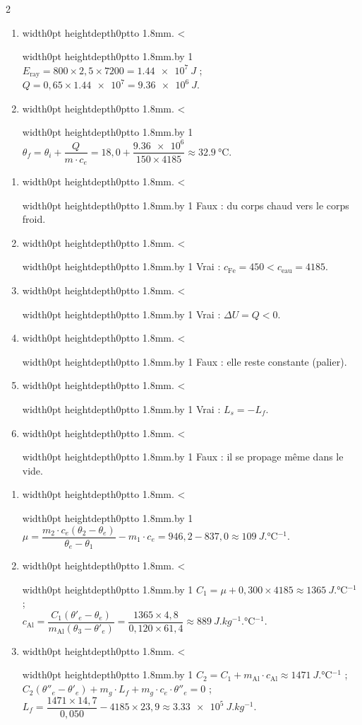 \documentclass[11pt,a4paper]{article}
\newif\ifeleve
\newlength{\interligne}\setlength{\interligne}{7mm}
\newlength{\replen}
\newcommand{\pointilles}{{\color{cInk2!60}\leaders\hbox to 1.8mm{\hss.\hss}\hfill}\kern0pt}
\newcommand{\lignes}[1]{\leavevmode\vrule width0pt height\dimexpr\interligne-1mm\relax depth0pt\pointilles
  \lgn=1 \loop\ifnum\lgn<#1 \par\nointerlineskip\noindent\vrule width0pt height\interligne depth0pt\pointilles\advance\lgn by 1 \repeat}
\newcommand{\rep}[1]{%
  \ifeleve
    \sbox{\repbox}{\parbox{\linewidth}{#1}}%
    \replen=\dimexpr\ht\repbox+\dp\repbox\relax
    \repn=\numexpr\replen/\baselineskip+1\relax
    \ifnum\repn<2 \repn=2\fi
    \edef\nblignes{\the\repn}\lignes{\nblignes}%
  \else #1\fi}
\newcommand{\dC}[1]{\qty{#1}{\degreeCelsius}}
\begin{document}
\begin{multicols}{2}
\begin{enumerate}[label={\sffamily\bfseries\arabic*.},leftmargin=5mm,itemsep=1pt]
  \item \rep{$E_{\mathrm{ray}} = 800\times2{,}5\times7200 = \qty{1,44e7}{J}$ ;\\ $Q = 0{,}65\times\num{1,44e7} = \qty{9,36e6}{J}$.}
  \item \rep{$\theta_f = \theta_i + \dfrac{Q}{m\cdot c_e} = 18{,}0 + \dfrac{\num{9,36e6}}{150\times4185} \approx \dC{32,9}$.}
\end{enumerate}

\begin{enumerate}[label={\sffamily\bfseries\alph*)},leftmargin=5mm,itemsep=0pt]
  \item \rep{Faux : du corps chaud vers le corps froid.}
  \item \rep{Vrai : $c_{\mathrm{Fe}} = 450 < c_{\mathrm{eau}} = 4185$.}
  \item \rep{Vrai : $\Delta U = Q < 0$.}
  \item \rep{Faux : elle reste constante (palier).}
  \item \rep{Vrai : $L_s = -L_f$.}
  \item \rep{Faux : il se propage même dans le vide.}
\end{enumerate}

\begin{enumerate}[label={\sffamily\bfseries\arabic*.},leftmargin=5mm,itemsep=1pt]
  \item \rep{$\mu = \dfrac{m_2\cdot c_e(\theta_2 - \theta_e)}{\theta_e - \theta_1} - m_1\cdot c_e = 946{,}2 - 837{,}0 \approx \qty{109}{J.\degreeCelsius^{-1}}$.}
  \item \rep{$C_1 = \mu + 0{,}300\times4185 \approx \qty{1365}{J.\degreeCelsius^{-1}}$ ;\\ $c_{\mathrm{Al}} = \dfrac{C_1(\theta'_e - \theta_e)}{m_{\mathrm{Al}}(\theta_3 - \theta'_e)} = \dfrac{1365\times4{,}8}{0{,}120\times61{,}4} \approx \qty{889}{J.kg^{-1}.\degreeCelsius^{-1}}$.}
  \item \rep{$C_2 = C_1 + m_{\mathrm{Al}}\cdot c_{\mathrm{Al}} \approx \qty{1471}{J.\degreeCelsius^{-1}}$ ;\\ $C_2(\theta''_e - \theta'_e) + m_g\cdot L_f + m_g\cdot c_e\cdot\theta''_e = 0$ ;\\ $L_f = \dfrac{1471\times14{,}7}{0{,}050} - 4185\times23{,}9 \approx \qty{3,33e5}{J.kg^{-1}}$.}
\end{enumerate}


\end{multicols}
\end{document}
